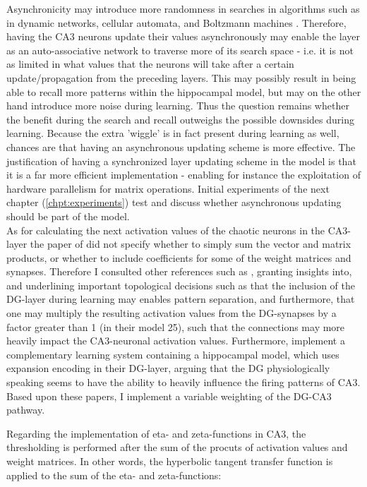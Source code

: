 Asynchronicity may introduce more randomness in searches in algorithms such as in dynamic networks, cellular automata, and Boltzmann machines \citep{Bar-yam1997}. Therefore, having the CA3 neurons update their values asynchronously may enable the layer as an auto-associative network to traverse more of its search space - i.e. it is not as limited in what values that the neurons will take after a certain update/propagation from the preceding layers. This may possibly result in being able to recall more patterns within the hippocampal model, but may on the other hand introduce more noise during learning. Thus the question remains whether the benefit during the search and recall outweighs the possible downsides during learning. Because the extra 'wiggle' is in fact present during learning as well, chances are that having an asynchronous updating scheme is more effective.
The justification of having a synchronized layer updating scheme in the model is that it is a far more efficient implementation - enabling for instance the exploitation of hardware parallelism for matrix operations. Initial experiments of the next chapter (\ref{chpt:experiments}) test and discuss whether asynchronous updating should be part of the model.
\\

As for calculating the next activation values of the chaotic neurons in the CA3-layer the paper of \cite{Hattori2014} did not specify whether to simply sum the vector and matrix products, or whether to include coefficients for some of the weight matrices and synapses. Therefore I consulted other references such as \citep{Wakagi2008}, granting insights into, and underlining important topological decisions such as that the inclusion of the DG-layer during learning may enables pattern separation, and furthermore, that one may multiply the resulting activation values from the DG-synapses by a factor greater than 1 (in their model 25), such that the connections may more heavily impact the CA3-neuronal activation values.
Furthermore, \cite{Norman2003} implement a complementary learning system containing a hippocampal model, which uses expansion encoding in their DG-layer, arguing that the DG physiologically speaking seems to have the ability to heavily influence the firing patterns of CA3. 
Based upon these papers, I implement a variable weighting of the DG-CA3 pathway. 

Regarding the implementation of eta- and zeta-functions in CA3, the thresholding is performed after the sum of the procuts of activation values and weight matrices. In other words, the hyperbolic tangent transfer function is applied to the sum of the eta- and zeta-functions: 

